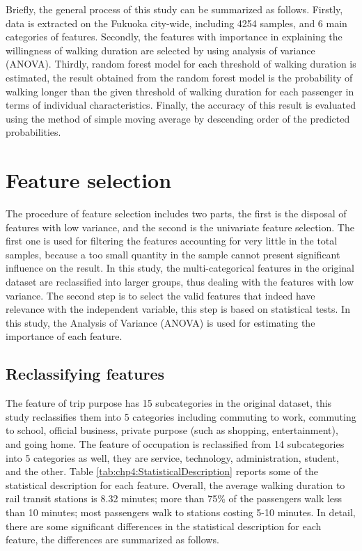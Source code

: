 %
Briefly, the general process of this study can be summarized as follows. Firstly, data is extracted on the Fukuoka city-wide, including 4254 samples, and 6 main categories of features. Secondly, the features with importance in explaining the willingness of walking duration are selected by using analysis of variance (ANOVA). Thirdly, random forest model for each threshold of walking duration is estimated, the result obtained from the random forest model is the probability of walking longer than the given threshold of walking duration for each passenger in terms of individual characteristics. Finally, the accuracy of this result is evaluated using the method of simple moving average by descending order of the predicted probabilities.

%
\section{Feature selection}
The procedure of feature selection includes two parts, the first is the disposal of features with low variance, and the second is the univariate feature selection. The first one is used for filtering the features accounting for very little in the total samples, because a too small quantity in the sample cannot present significant influence on the result. In this study, the multi-categorical features in the original dataset are reclassified into larger groups, thus dealing with the features with low variance. The second step is to select the valid features that indeed have relevance with the independent variable, this step is based on statistical tests. In this study, the Analysis of Variance (ANOVA) is used for estimating the importance of each feature.

%
\subsection{Reclassifying features}
The feature of trip purpose has 15 subcategories in the original dataset, this study reclassifies them into 5 categories including commuting to work, commuting to school, official business, private purpose (such as shopping, entertainment), and going home. The feature of occupation is reclassified from 14 subcategories into 5 categories as well, they are service, technology, administration, student, and the other. Table \ref{tab:chp4:StatisticalDescription} reports some of the statistical description for each feature. Overall, the average walking duration to rail transit stations is 8.32 minutes; more than 75\% of the passengers walk less than 10 minutes; most passengers walk to stations costing 5-10 minutes. In detail, there are some significant differences in the statistical description for each feature, the differences are summarized as follows.

